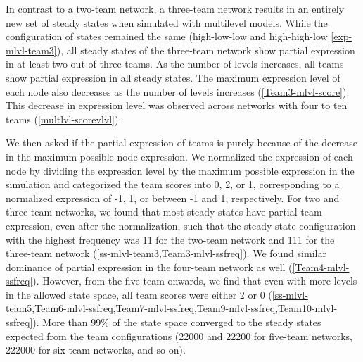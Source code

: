 \documentclass[11pt,a4paper]{article}
\theoremstyle{definition}
\theoremstyle{remark}
\begin{document}
In contrast to a two-team network, a three-team network results in an entirely new set of steady states when simulated with multilevel models.  While the configuration of states remained the same (high-low-low and high-high-low \cref{exp-mlvl-team3}), all steady states of the three-team network show partial expression in at least two out of three teams. As the number of levels increases, all teams show partial expression in all steady states. The maximum expression level of each node also decreases as the number of levels increases (\cref{Team3-mlvl-score}). This decrease in expression level was observed across networks with four to ten teams (\cref{multlvl-scorevlvl}). 

We then asked if the partial expression of teams is purely because of the decrease in the maximum possible node expression. We normalized the expression of each node by dividing the expression level by the maximum possible expression in the simulation and categorized the team scores into 0, 2, or 1, corresponding to a normalized expression of -1, 1, or between -1 and 1, respectively. For two and three-team networks, we found that most steady states have partial team expression, even after the normalization, such that the steady-state configuration with the highest frequency was 11 for the two-team network and 111 for the three-team network (\cref{ss-mlvl-team3,Team3-mlvl-ssfreq}). We found similar dominance of partial expression in the four-team network as well (\cref{Team4-mlvl-ssfreq}). However, from the five-team onwards, we find that even with more levels in the allowed state space, all team scores were either 2 or 0 (\cref{ss-mlvl-team5,Team6-mlvl-ssfreq,Team7-mlvl-ssfreq,Team9-mlvl-ssfreq,Team10-mlvl-ssfreq}). More than 99\% of the state space converged to the steady states expected from the team configurations (22000 and 22200 for five-team networks, 222000 for six-team networks, and so on).
\end{document}
